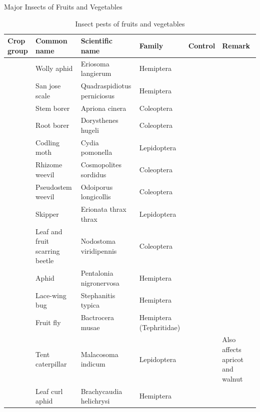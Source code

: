 \documentclass[10pt,dvipsnames,ignorenonframetext,aspectratio=169]{beamer}
\begin{document}
\begin{frame}{Major Insects of Fruits and Vegetables}
\protect\hypertarget{major-insects-of-fruits-and-vegetables}{}
\renewcommand{\arraystretch}{0.6} 
\begin{table}

\caption{\label{tab:major-insects-fruits-vegetables}Insect pests of fruits and vegetables}
\centering
\fontsize{4}{6}\selectfont
\begin{tabular}[t]{>{\raggedright\arraybackslash}p{6em}>{\raggedright\arraybackslash}p{10em}>{\raggedright\arraybackslash}p{14em}>{\raggedright\arraybackslash}p{12em}>{\raggedright\arraybackslash}p{8em}>{\raggedright\arraybackslash}p{10em}}
\toprule
Crop group & Common name & Scientific name & Family & Control & Remark\\
\midrule
 & Wolly aphid & Eriosoma langierum & Hemiptera &  & \\
\cmidrule{2-6}
 & San jose scale & Quadraspidiotus perniciosus & Hemiptera &  & \\
\cmidrule{2-6}
 & Stem borer & Apriona cinera & Coleoptera &  & \\
\cmidrule{2-6}
 & Root borer & Dorysthenes hugeli & Coleoptera &  & \\
\cmidrule{2-6}
\multirow{-5}{6em}{\raggedright\arraybackslash Apple} & Codling moth & Cydia pomonella & Lepidoptera &  & \\
\cmidrule{1-6}
 & Rhizome weevil & Cosmopolites sordidus & Coleoptera &  & \\
\cmidrule{2-6}
 & Pseudostem weevil & Odoiporus longicollis & Coleoptera &  & \\
\cmidrule{2-6}
 & Skipper & Erionata thrax thrax & Lepidoptera &  & \\
\cmidrule{2-6}
 & Leaf and fruit scarring beetle & Nodostoma viridipennis & Coleoptera &  & \\
\cmidrule{2-6}
 & Aphid & Pentalonia nigronervosa & Hemiptera &  & \\
\cmidrule{2-6}
 & Lace-wing bug & Stephanitis typica & Hemiptera &  & \\
\cmidrule{2-6}
\multirow{-7}{6em}{\raggedright\arraybackslash Banana} & Fruit fly & Bactrocera musae & Hemiptera (Tephritidae) &  & \\
\cmidrule{1-6}
 & Tent caterpillar & Malacosoma indicum & Lepidoptera &  & Also affects apricot and walnut\\
\cmidrule{2-6}
\multirow{-2}{6em}{\raggedright\arraybackslash Peach} & Leaf curl aphid & Brachycaudia helichrysi & Hemiptera &  & \\
\bottomrule
\end{tabular}
\end{table}
\end{frame}
\end{document}
